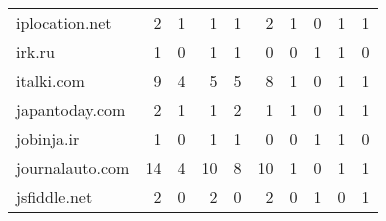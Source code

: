 \begin{tabular}{lrrrrrrrrr}
             iplocation.net &                                2 &                                  1 &                                      1 &                            1 &                           2 &                                   1 &                                      0 &                             1 &                            1 \\
                     irk.ru &                                1 &                                  0 &                                      1 &                            1 &                           0 &                                   0 &                                      1 &                             1 &                            0 \\
                 italki.com &                                9 &                                  4 &                                      5 &                            5 &                           8 &                                   1 &                                      0 &                             1 &                            1 \\
             japantoday.com &                                2 &                                  1 &                                      1 &                            2 &                           1 &                                   1 &                                      0 &                             1 &                            1 \\
                 jobinja.ir &                                1 &                                  0 &                                      1 &                            1 &                           0 &                                   0 &                                      1 &                             1 &                            0 \\
            journalauto.com &                               14 &                                  4 &                                     10 &                            8 &                          10 &                                   1 &                                      0 &                             1 &                            1 \\
               jsfiddle.net &                                2 &                                  0 &                                      2 &                            0 &                           2 &                                   0 &                                      1 &                             0 &                            1 \\

\end{tabular}
